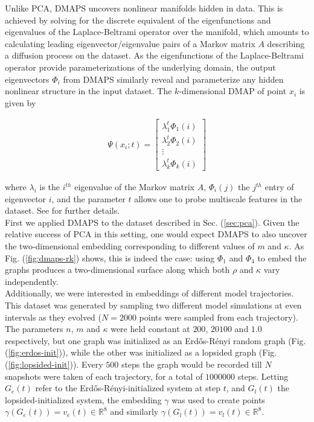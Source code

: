 \documentclass[epjST, final]{svjour}
\begin{document}
\begin{onehalfspace}
Unlike PCA, DMAPS uncovers nonlinear manifolds hidden in data. This is
achieved by solving for the discrete equivalent of the eigenfunctions
and eigenvalues of the Laplace-Beltrami operator over the manifold,
which amounts to calculating leading eigenvector/eigenvalue pairs of a
Markov matrix $A$ describing a diffusion process on the dataset. As the
eigenfunctions of the Laplace-Beltrami operator provide
parameterizations of the underlying domain, the output eigenvectors $\Phi_i$
from DMAPS similarly reveal and parameterize any hidden nonlinear
structure in the input dataset. The $k$-dimensional DMAP of point
$x_i$ is given by

\begin{align*}
  \Psi(x_i; t) = \begin{bmatrix} \lambda_1^t \Phi_1(i) \\ \lambda_2^t
    \Phi_2(i) \\ \vdots \\
    \lambda_k^t \Phi_k(i) \end{bmatrix}
\end{align*}

where $\lambda_i$ is the $i^{th}$ eigenvalue of the Markov matrix $A$,
$\Phi_i(j)$ the $j^{th}$ entry of eigenvector $i$, and the parameter
$t$ allows one to probe multiscale features in the dataset. See
\cite{coifman_diffusion_2006,nadler_diffusion_2006} for
further details. \\

First we applied DMAPS to the dataset described in
Sec. (\ref{sec:pca}). Given the relative success of PCA in this
setting, one would expect DMAPS to also uncover the two-dimensional
embedding corresponding to different values of $m$ and $\kappa$. As
Fig. (\ref{fig:dmaps-rk}) shows, this is indeed the case: using
$\Phi_1$ and $\Phi_4$ to embed the graphs produces a two-dimensional
surface along which both $\rho$ and $\kappa$ vary independently. \\

Additionally, we were interested in embeddings of different model
trajectories. This dataset was generated by sampling two different
model simulations at even intervals as they evolved ($N=2000$ points were
sampled from each trajectory). The parameters $n$, $m$ and $\kappa$
were held constant at $200$, $20100$ and $1.0$ respectively, but one
graph was initialized as an Erd\H{o}s-R\'{e}nyi random graph
(Fig. (\ref{fig:erdos-init})), while the other was initialized as a
lopsided graph (Fig. (\ref{fig:lopsided-init})). Every $500$ steps the
graph would be recorded till $N$ snapshots were taken of each
trajectory, for a total of $1000000$ steps. Letting $G_e(t)$ refer
to the Erd\H{o}s-R\'{e}nyi-initialized system at step $t$, and
$G_l(t)$ the lopsided-initialized system, the embedding $\gamma$ was
used to create points $\gamma(G_e(t)) = v_e(t) \in \mathbb{R}^8$ and
similarly $\gamma(G_l(t)) = v_l(t) \in \mathbb{R}^8$. \\


\end{onehalfspace}
\end{document}
